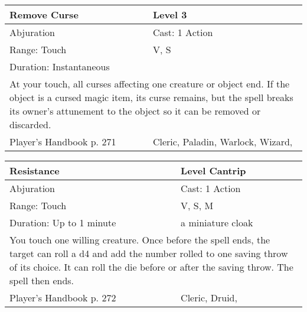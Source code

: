 \documentclass[11pt]{report}
\begin{document}
\begin{table}[H]
	\begin{tabular}{||p{6cm}|p{6cm}||}
		\hline\hline
		\bf{Remove Curse} & Level 3\\ \hline
		Abjuration & Cast: 1 Action\\ \hline
		Range: Touch & V, S\\ \hline
		Duration: Instantaneous & \\ \hline
		\multicolumn{2}{||p{12cm}||}{At your touch, all curses affecting one creature or object end. If the object is a cursed magic item, its curse remains, but the spell breaks its owner’s attunement to the object so it can be removed or discarded.}\\ \hline
Player's Handbook p. 271 & Cleric, Paladin, Warlock, Wizard, \\ \hline\hline
	\end{tabular}
\end{table}

\begin{table}[H]
	\begin{tabular}{||p{6cm}|p{6cm}||}
		\hline\hline
		\bf{Resistance} & Level Cantrip\\ \hline
		Abjuration & Cast: 1 Action\\ \hline
		Range: Touch & V, S, M\\ \hline
		Duration: Up to 1 minute & a miniature cloak\\ \hline
		\multicolumn{2}{||p{12cm}||}{You touch one willing creature. Once before the spell ends, the target can roll a d4 and add the number rolled to one saving throw of its choice. It can roll the die before or after the saving throw. The spell then ends.}\\ \hline
Player's Handbook p. 272 & Cleric, Druid, \\ \hline\hline
	\end{tabular}
\end{table}
\end{document}
